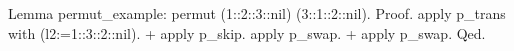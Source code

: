 Lemma permut_example:
  permut (1::2::3::nil) (3::1::2::nil).
Proof.
  apply p_trans with (l2:=1::3::2::nil).
  + apply p_skip.
    apply p_swap.
  + apply p_swap.
Qed.